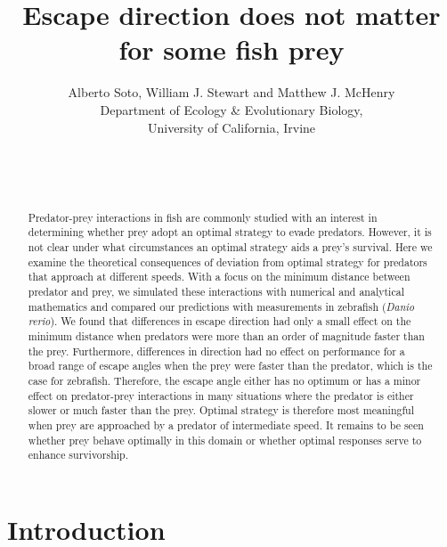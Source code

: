 \documentclass[12pt]{article}
\title{Escape direction does not matter for some fish prey}
\author{Alberto Soto, William J. Stewart and Matthew J. McHenry\\
  Department of Ecology \& Evolutionary Biology,\\
  University of California, Irvine\\ \\ \\ \\}
\begin{document}

\maketitle

\pagebreak


\begin{abstract}

Predator-prey interactions in fish are commonly studied with an interest in
determining whether prey adopt an optimal strategy to evade predators. However,
it is not clear under what circumstances an optimal strategy aids a prey's
survival. Here we examine the theoretical consequences of deviation from
optimal strategy for predators that approach at different speeds. With a focus
on the minimum distance between predator and prey, we simulated these
interactions with numerical and analytical mathematics and compared our
predictions with measurements in zebrafish (\textit{Danio rerio}). We found
that differences in escape direction had only a small effect on the minimum
distance when predators were more than an order of magnitude faster than the
prey. Furthermore, differences in direction had no effect on performance for a
broad range of escape angles when the prey were faster than the predator, which
is the case for zebrafish. Therefore, the escape angle either has no optimum or
has a minor effect on predator-prey interactions in many situations where the
predator is either slower or much faster than the prey. Optimal strategy is
therefore most meaningful when prey are approached by a predator of
intermediate speed. It remains to be seen whether prey behave optimally in this
domain or whether optimal responses serve to enhance
survivorship.

\end{abstract}

\pagebreak


\section{Introduction}
\label{intro}
\end{document}
